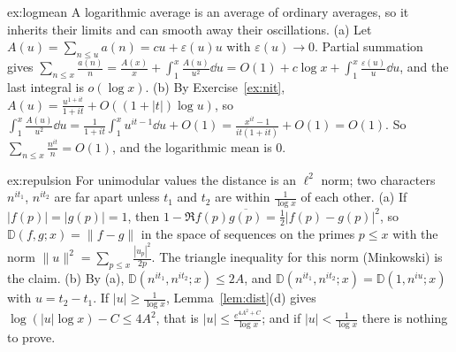 \begin{solution}{ex:logmean}
\idea A logarithmic average is an average of ordinary averages, so it inherits their limits and can smooth away their oscillations.
\writeup (a) Let $A(u)=\sum_{n\le u}a(n)=cu+\varepsilon(u)u$ with $\varepsilon(u)\to0$. Partial summation gives $\sum_{n\le x}\frac{a(n)}n=\frac{A(x)}x+\int_1^x\frac{A(u)}{u^2}\dd u=O(1)+c\log x+\int_1^x\frac{\varepsilon(u)}u\dd u$, and the last integral is $o(\log x)$.
(b) By Exercise~\ref{ex:nit}, $A(u)=\frac{u^{1+it}}{1+it}+O((1+|t|)\log u)$, so $\int_1^x\frac{A(u)}{u^2}\dd u=\frac1{1+it}\int_1^xu^{it-1}\dd u+O(1)=\frac{x^{it}-1}{it(1+it)}+O(1)=O(1)$. So $\sum_{n\le x}\frac{n^{it}}n=O(1)$, and the logarithmic mean is $0$.
\end{solution}

\begin{solution}{ex:repulsion}
\idea For unimodular values the distance is an $\ell^2$ norm; two characters $n^{it_1}$, $n^{it_2}$ are far apart unless $t_1$ and $t_2$ are within $\frac1{\log x}$ of each other.
\writeup (a) If $|f(p)|=|g(p)|=1$, then $1-\Re f(p)\overline{g(p)}=\frac12|f(p)-g(p)|^2$, so $\mathbb D(f,g;x)=\|f-g\|$ in the space of sequences on the primes $p\le x$ with the norm $\|u\|^2=\sum_{p\le x}\frac{|u_p|^2}{2p}$. The triangle inequality for this norm (Minkowski) is the claim.
(b) By (a), $\mathbb D(n^{it_1},n^{it_2};x)\le2A$, and $\mathbb D(n^{it_1},n^{it_2};x)=\mathbb D(1,n^{iu};x)$ with $u=t_2-t_1$. If $|u|\ge\frac1{\log x}$, Lemma~\ref{lem:dist}(d) gives $\log(|u|\log x)-C\le4A^2$, that is $|u|\le\frac{e^{4A^2+C}}{\log x}$; and if $|u|<\frac1{\log x}$ there is nothing to prove.
\end{solution}

